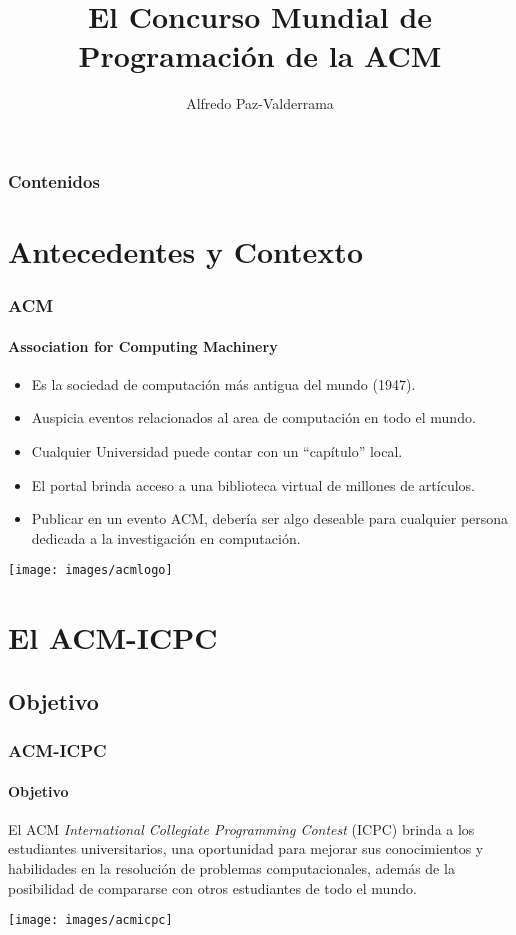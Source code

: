 \documentclass{beamer}
\title%
{El Concurso Mundial de Programación de la ACM}
\author%
{Alfredo Paz-Valderrama \inst{1}}
\institute%
{
  \inst{1}%
  Sociedad Peruana de Computación
}
\begin{document}
\begin{frame}
  \titlepage
\end{frame}

\begin{frame}
  \frametitle{Contenidos}
  \tableofcontents
\end{frame}

\section{Antecedentes y Contexto}
\begin{frame}
  \frametitle{ACM }
  \framesubtitle{Association for Computing Machinery}
  \begin{itemize}
   \item Es la sociedad de computación más antigua del mundo (1947).
   \item Auspicia eventos relacionados al area de computación en todo el mundo.
   \item Cualquier Universidad puede contar con un ``capítulo'' local.
   \item El portal brinda acceso a una biblioteca virtual de millones de artículos.
   \item Publicar en un evento ACM, debería ser algo deseable para cualquier persona dedicada a la investigación en computación.
  \end{itemize}
  \begin{center}
   \texttt{[image: images/acmlogo]}
  \end{center}
\end{frame}

\section{El ACM-ICPC}
\subsection{Objetivo}
\begin{frame}
  \frametitle{ACM-ICPC}
  \framesubtitle{Objetivo}
  El ACM \emph{International Collegiate Programming Contest} (ICPC) brinda a los estudiantes universitarios, una oportunidad para mejorar sus conocimientos y habilidades en la resolución de problemas computacionales, además de la posibilidad de compararse con otros estudiantes de todo el mundo.
  \begin{center}
   \texttt{[image: images/acmicpc]}
  \end{center}
\end{frame}
\end{document}
